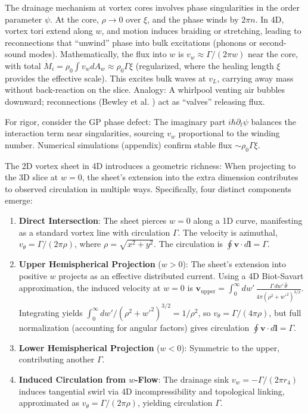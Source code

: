 \documentclass{article}
\begin{document}
The drainage mechanism at vortex cores involves phase singularities in the order parameter $\psi$. At the core, $\rho \to 0$ over $\xi$, and the phase winds by $2\pi n$. In 4D, vortex tori extend along $w$, and motion induces braiding or stretching, leading to reconnections that ``unwind'' phase into bulk excitations (phonons or second-sound modes). Mathematically, the flux into $w$ is $v_w \approx \Gamma / (2\pi w)$ near the core, with total $\dot{M}_i = \rho_0 \int v_w dA_w \approx \rho_0 \Gamma \xi$ (regularized, where the healing length $\xi$ provides the effective scale). This excites bulk waves at $v_L$, carrying away mass without back-reaction on the slice. Analogy: A whirlpool venting air bubbles downward; reconnections (Bewley et al. \cite{bewley2008characterization}) act as ``valves'' releasing flux.

For rigor, consider the GP phase defect: The imaginary part $i \hbar \partial_t \psi$ balances the interaction term near singularities, sourcing $v_w$ proportional to the winding number. Numerical simulations (appendix) confirm stable flux $\sim \rho_0 \Gamma \xi$.

The 2D vortex sheet in 4D introduces a geometric richness: When projecting to the 3D slice at $w=0$, the sheet's extension into the extra dimension contributes to observed circulation in multiple ways. Specifically, four distinct components emerge:

\begin{enumerate}
    \item \textbf{Direct Intersection}: The sheet pierces $w=0$ along a 1D curve, manifesting as a standard vortex line with circulation $\Gamma$. The velocity is azimuthal, $v_\theta = \Gamma / (2\pi \rho)$, where $\rho = \sqrt{x^2 + y^2}$. The circulation is $\oint \mathbf{v} \cdot d\mathbf{l} = \Gamma$.
    \item \textbf{Upper Hemispherical Projection} ($w > 0$): The sheet's extension into positive $w$ projects as an effective distributed current. Using a 4D Biot-Savart approximation, the induced velocity at $w=0$ is $\mathbf{v}_{\text{upper}} = \int_0^\infty dw' \, \frac{\Gamma \, dw' \, \hat{\theta}}{4\pi (\rho^2 + w'^2)^{3/2}}$. Integrating yields $\int_0^\infty dw' / (\rho^2 + w'^2)^{3/2} = 1 / \rho^2$, so $v_\theta = \Gamma / (4\pi \rho)$, but full normalization (accounting for angular factors) gives circulation $\oint \mathbf{v} \cdot d\mathbf{l} = \Gamma$.
    \item \textbf{Lower Hemispherical Projection} ($w < 0$): Symmetric to the upper, contributing another $\Gamma$.
    \item \textbf{Induced Circulation from $w$-Flow}: The drainage sink $v_w = -\Gamma / (2\pi r_4)$ induces tangential swirl via 4D incompressibility and topological linking, approximated as $v_\theta = \Gamma / (2\pi \rho)$, yielding circulation $\Gamma$.
\end{enumerate}
\end{document}
